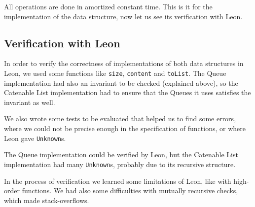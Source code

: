 All operations are done in amortized constant time.
This is it for the implementation of the data structure,
now let us see its verification with Leon.

\subsection{Verification with Leon}
In order to verify the correctness of implementations of both data structures in Leon,
we used some functions like \verb|size|, \verb|content| and \verb|toList|.
The Queue implementation had also an invariant to be checked (explained above),
so the Catenable List implementation had to ensure that the Queues it uses 
satisfies the invariant as well.

We also wrote some tests to be evaluated that helped us to find some errors,
where we could not be precise enough in the specification of functions,
or where Leon gave \verb|Unknown|s.

The Queue implementation could be verified by Leon,
but the Catenable List implementation had many \verb|Unknown|s,
probably due to its recursive structure.

In the process of verification we learned some limitations of Leon,
like with high-order functions.
We had also some difficulties with mutually recursive checks, 
which made stack-overflows.

